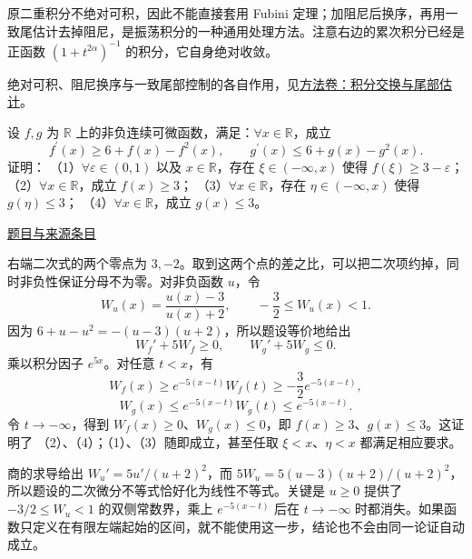 \documentclass[UTF8,12pt,a4paper,fontset=fandol]{ctexart}
\begin{document}
\begin{remark}[方法与条件]原二重积分不绝对可积，因此不能直接套用 Fubini 定理；加阻尼后换序，再用一致尾估计去掉阻尼，是振荡积分的一种通用处理方法。注意右边的累次积分已经是正函数 $(1+t^{2\alpha})^{-1}$ 的积分，它自身绝对收敛。

绝对可积、阻尼换序与一致尾部控制的各自作用，见\hyperref[app:integration-exchange]{方法卷：积分交换与尾部估计}。\end{remark}

\begin{example}[来源序号6]\label{ex:ch07-13th-A:6}\label{pr:ch07-13th-A:6}

设 $f,g$ 为 $\mathbb{R}$ 上的非负连续可微函数，满足：$\forall x\in\mathbb{R}$，成立
\[
f^{\prime}(x)\geq 6+f(x)-f^{2}(x),\qquad g^{\prime}(x)\leq 6+g(x)-g^{2}(x).
\]
证明：
（1）$\forall\varepsilon\in(0,1)$ 以及 $x\in\mathbb{R}$，存在 $\xi\in(-\infty,x)$ 使得 $f(\xi)\geq 3-\varepsilon$；
（2）$\forall x\in\mathbb{R}$，成立 $f(x)\geq 3$；
（3）$\forall x\in\mathbb{R}$，存在 $\eta\in(-\infty,x)$ 使得 $g(\eta)\leq 3$；
（4）$\forall x\in\mathbb{R}$，成立 $g(x)\leq 3$。

\par\href{https://github.com/lzxcr/cmc-mathematics/blob/64916fa1fdbc3e444a652eca204d5669058ee321/src/problems/preliminary/13/06.md}{题目与来源条目}

\end{example}

\begin{solve}\label{ans:ch07-13th-A:6}

右端二次式的两个零点为 $3,-2$。取到这两个点的差之比，可以把二次项约掉，同时非负性保证分母不为零。对非负函数 $u$，令
\[
W_u(x)=\frac{u(x)-3}{u(x)+2},\qquad -\frac32\leq W_u(x)<1.
\]
因为 $6+u-u^2=-(u-3)(u+2)$，所以题设等价地给出
\[
W_f'+5W_f\geq0,\qquad W_g'+5W_g\leq0.
\]
乘以积分因子 $e^{5x}$。对任意 $t<x$，有
\[
W_f(x)\geq e^{-5(x-t)}W_f(t)
\geq-\frac32e^{-5(x-t)},
\]
\[
W_g(x)\leq e^{-5(x-t)}W_g(t)
\leq e^{-5(x-t)}.
\]
令 $t\to-\infty$，得到 $W_f(x)\geq0$、$W_g(x)\leq0$，即 $f(x)\geq3$、$g(x)\leq3$。这证明了 （2）、（4）；（1）、（3）随即成立，甚至任取 $\xi<x$、$\eta<x$ 都满足相应要求。

商的求导给出 $W_u'=5u'/(u+2)^2$，而 $5W_u=5(u-3)(u+2)/(u+2)^2$，所以题设的二次微分不等式恰好化为线性不等式。关键是 $u\ge0$ 提供了 $-3/2\le W_u<1$ 的双侧常数界，乘上 $e^{-5(x-t)}$ 后在 $t\to-\infty$ 时都消失。如果函数只定义在有限左端起始的区间，就不能使用这一步，结论也不会由同一论证自动成立。

\end{solve}
\end{document}
